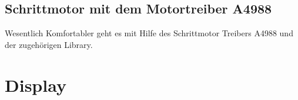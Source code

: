 \subsection{Schrittmotor mit dem Motortreiber A4988}

Wesentlich Komfortabler geht es mit Hilfe des Schrittmotor Treibers A4988 und der zugehörigen Library.  








\section{Display}




